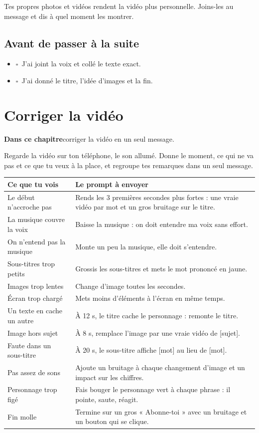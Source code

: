 \documentclass[11pt,oneside,openany]{book}
\newcommand{\coche}{$\square$\ }
\newcommand{\objectif}[1]{\begin{tcolorbox}[enhanced,colback=encre,colframe=encre,arc=2pt,boxrule=0pt,left=9pt,right=9pt,top=6pt,bottom=6pt,fontupper=\small\color{white}]{\color{citron}\bfseries Dans ce chapitre}\quad #1\end{tcolorbox}}
\newenvironment{bilan}{\section*{Avant de passer à la suite}\begin{itemize}[label={}]}{\end{itemize}}
\begin{document}
\begin{astuce}
Tes propres photos et vidéos rendent la vidéo plus personnelle. Joins-les au message et dis à quel moment les montrer.
\end{astuce}

\enlargethispage{3\baselineskip}
\begin{bilan}
  \item \coche J'ai joint la voix et collé le texte exact.
  \item \coche J'ai donné le titre, l'idée d'images et la fin.
\end{bilan}

\chapter{Corriger la vidéo}
\objectif{corriger la vidéo en un seul message.}
Regarde la vidéo sur ton téléphone, le son allumé. Donne le moment, ce qui ne va pas et ce que tu veux à la place, et regroupe tes remarques dans un seul message.

\renewcommand{\arraystretch}{1.3}
\begin{center}\small
\begin{tabularx}{\linewidth}{>{\raggedright\arraybackslash}p{2.7cm}>{\raggedright\arraybackslash\ttfamily}X}
\toprule
\textbf{Ce que tu vois} & \textrm{\textbf{Le prompt à envoyer}} \\ \midrule
Le début n'accroche pas & Rends les 3 premières secondes plus fortes : une vraie vidéo par mot et un gros bruitage sur le titre. \\
La musique couvre la voix & Baisse la musique : on doit entendre ma voix sans effort. \\
On n'entend pas la musique & Monte un peu la musique, elle doit s'entendre. \\
Sous-titres trop petits & Grossis les sous-titres et mets le mot prononcé en jaune. \\
Images trop lentes & Change d'image toutes les secondes. \\
Écran trop chargé & Mets moins d'éléments à l'écran en même temps. \\
Un texte en cache un autre & À 12 s, le titre cache le personnage : remonte le titre. \\
Image hors sujet & À 8 s, remplace l'image par une vraie vidéo de [sujet]. \\
Faute dans un sous-titre & À 20 s, le sous-titre affiche [mot] au lieu de [mot]. \\
Pas assez de sons & Ajoute un bruitage à chaque changement d'image et un impact sur les chiffres. \\
Personnage trop figé & Fais bouger le personnage vert à chaque phrase : il pointe, saute, réagit. \\
Fin molle & Termine sur un gros « Abonne-toi » avec un bruitage et un bouton qui se clique. \\ \bottomrule
\end{tabularx}
\end{center}
\end{document}
